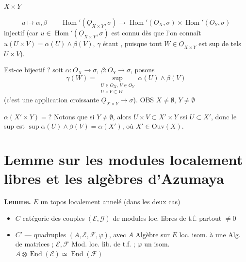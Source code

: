 \documentclass[11pt,a4paper]{article}
\begin{document}
$X \times Y$



\[
u \longmapsto \alpha, \beta \qquad
\operatorname{Hom}'(\underline{O}_{X \times Y}, \sigma) \longrightarrow
\operatorname{Hom}'(O_{X}, \sigma) \times \operatorname{Hom}'(O_{Y}, \sigma)
\]
injectif (car $u \in \operatorname{Hom}'(\underline{O}_{X \times Y}, \sigma)$ est
connu dès que l'on connaît $u(U \times V) = \alpha(U) \wedge \beta(V)$, $\gamma$
étant \ill{}, puisque tout $W \in \underline{O}_{X \times Y}$ est sup de tels
$U \times V$).

Est-ce bijectif ? soit $\alpha : O_{X} \to \sigma$, $\beta : O_{Y} \to \sigma$,
posons
\[
\gamma(W) = \sup_{\substack{U \in O_{X},\ V \in O_{Y} \\ U \times V \subset W}}
\alpha(U) \wedge \beta(V)
\]
(c'est une application croissante
$\underline{O}_{X \times Y} \to \sigma$). \quad OBS $X \neq \emptyset$,
$Y \neq \emptyset$

$\alpha(X' \times Y) = ?$ Notons que si $Y \neq \emptyset$, alors
$U \times V \subset X' \times Y$ ssi $U \subset X'$, donc le sup est
 $\sup \alpha(U) \wedge \beta(V) = \alpha(X')$, où
$X' \in \mathrm{Ouv}(X)$.


\section*{Lemme sur les modules localement libres et les algèbres d'Azumaya}

\textbf{Lemme.} $E$ un topos  localement annelé (dans les deux
cas)

\begin{itemize}
\item $C$ catégorie des couples $(\mathcal{E}, \mathcal{G})$ de modules loc.
libres de t.f. partout $\neq 0$
\item $C'$ — quadruples $(A, \mathcal{E}, \mathcal{F}, \varphi)$,
avec
$A$ Algèbre sur $E$ loc. isom. à une Alg. de matrices ; $\mathcal{E}, \mathcal{F}$
Mod. loc. lib. de t.f. ; $\varphi$ un isom.
$A \otimes \underline{\operatorname{End}}(\mathcal{E}) \simeq
\underline{\operatorname{End}}(\mathcal{F})$
\end{itemize}
\end{document}
